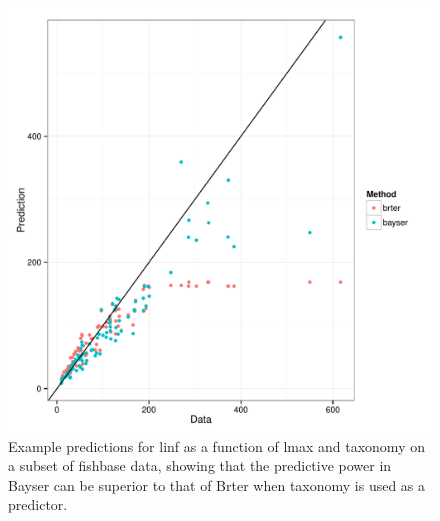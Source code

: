 \documentclass{dragonfly-report}
\begin{document}
\begin{knitrout}
\color{fgcolor}\begin{kframe}
\begin{alltt}

 \hlopt{+}
  \hlstd{(}\hlstd{(}      \hlopt{+}
  \hlstd{(}\hlstd{=}\hlstd{,} \hlstd{=}\hlstd{)} \hlopt{+}
  \hlstd{()} \hlopt{+}
  \hlstd{(}\hlstd{)} \hlopt{+}
  \hlstd{(}\hlstd{)} \hlopt{+}
  \hlstd{(}\hlstd{)}
\end{alltt}
\end{kframe}\begin{figure}[]

\includegraphics[width=\maxwidth]{figure/unnamed-chunk-2-1} \caption[Example predictions for linf as a function of lmax and taxonomy on a subset of fishbase data, showing that the predictive power in Bayser can be superior to that of Brter when taxonomy is used as a predictor]{Example predictions for linf as a function of lmax and taxonomy on a subset of fishbase data, showing that the predictive power in Bayser can be superior to that of Brter when taxonomy is used as a predictor.\label{fig:unnamed-chunk-2}}
\end{figure}


\end{knitrout}
\end{document}
